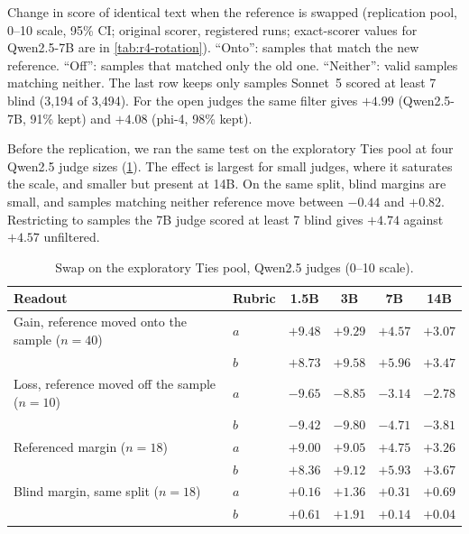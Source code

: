 \begin{table}[htbp]
\centering
\caption{Change in score of identical text when the reference is swapped (replication pool, 0--10 scale, 95\% CI; original scorer, registered runs; exact-scorer values for Qwen2.5-7B are in \cref{tab:r4-rotation}). ``Onto'': samples that match the new reference. ``Off'': samples that matched only the old one. ``Neither'': valid samples matching neither. The last row keeps only samples Sonnet~5 scored at least 7 blind (3,194 of 3,494). For the open judges the same filter gives $+4.99$  (Qwen2.5-7B, 91\% kept) and $+4.08$ (phi-4, 98\% kept).\pre}
\label{tab:rotation}
\footnotesize
\setlength{\tabcolsep}{3pt}
\begin{adjustbox}{max width=\linewidth}\end{adjustbox}

\end{table}

Before the replication, we ran the same test on the exploratory Ties pool at four Qwen2.5 judge sizes (\cref{tab:ladder}). The effect is largest for small judges, where it saturates the scale, and smaller but present at 14B. On the same split, blind margins are small, and samples matching neither reference move between $-0.44$ and $+0.82$. Restricting to samples the 7B judge scored at least 7 blind gives $+4.74$  against $+4.57$ unfiltered.

\begin{table}[htbp]
\centering
\caption{Swap on the exploratory Ties pool, Qwen2.5 judges (0--10 scale).\pre}
\label{tab:ladder}
\footnotesize
\setlength{\tabcolsep}{4pt}
\begin{tabular}{llcccc}
\toprule
Readout & Rubric & 1.5B & 3B & 7B & 14B \\
\midrule
Gain, reference moved onto the sample ($n{=}40$) & $a$ & $+9.48$ & $+9.29$ & $+4.57$ & $+3.07$ \\
 & $b$ & $+8.73$ & $+9.58$ & $+5.96$ & $+3.47$ \\
Loss, reference moved off the sample ($n{=}10$) & $a$ & $-9.65$ & $-8.85$ & $-3.14$ & $-2.78$ \\
 & $b$ & $-9.42$ & $-9.80$ & $-4.71$ & $-3.81$ \\
Referenced margin ($n{=}18$) & $a$ & $+9.00$ & $+9.05$ & $+4.75$ & $+3.26$ \\
 & $b$ & $+8.36$ & $+9.12$ & $+5.93$ & $+3.67$ \\
Blind margin, same split ($n{=}18$) & $a$ & $+0.16$ & $+1.36$ & $+0.31$ & $+0.69$ \\
 & $b$ & $+0.61$ & $+1.91$ & $+0.14$ & $+0.04$ \\
\bottomrule
\end{tabular}

\end{table}

